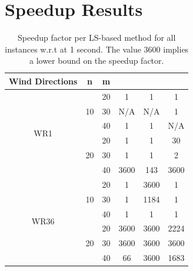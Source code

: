 \documentclass[preprint,12pt]{elsarticle}
\newcommand{\qcls}{{\sf {\small QC-LS\xspace}}}
\newcommand{\ilpls}{{\sf {\small ILP-LS\xspace}}}
\newcommand{\qulsgrb}{{\sf {\small QU-LS(GRB)\xspace}}}
\newcommand{\qulsda}{{\sf {\small QU-LS(DA)\xspace}}}
\begin{document}
\appendix

\section{Speedup Results}
\label{app1}


\begin{table}[t!]
	\small
	\centering
	\begin{tabular}{| c | c | c | c | c | c | }
		\toprule
		Wind Directions  & n  & m  & \qcls &  \ilpls & \qulsgrb  \\
		\toprule
		\multirow{6}{*}{WR1}  & \multirow{3}{*}{10}  & 20 & 1       & 1 & 1  \\
		& & 30   & N/A & N/A & 1     \\
		& & 40 & 1 & 1 & N/A                \\
		\cline{2-6}
		&\multirow{3}{*}{20}   & 20  & 1  & 1  & 30         \\
		&&30   & 1 & 1  & 2    \\
		&&40   & 3600 & 143 & 3600        \\
		\hline
		\multirow{6}{*}{WR36} &  \multirow{3}{*}{10}    & 20 & 1       & 3600 & 1  \\
		&& 30  & 1 & 1184 & 1                     \\
		&&40   & 1 & 1 & 1          \\
		\cline{2-6}
		&  \multirow{3}{*}{20}   & 20   & 3600  & 3600 & 2224            \\
		&&30   & 3600 & 3600 & 3600                     \\
		&&40   & 66 & 3600 & 1683 \\
		\bottomrule                   
	\end{tabular}
	
	\vspace{0.5em}
	\caption{Speedup factor per LS-based method for all instances w.r.t \qulsda{} at 1 second. The value 3600 implies a lower bound on the speedup factor.}\label{tab:results3}
\end{table}
\end{document}
